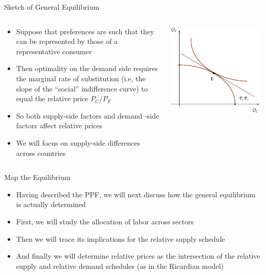 \documentclass[10pt,hyperref={CJKbookmarks=true},xcolor=dvipsnames,aspectratio=169]{beamer}
\begin{document}
\begin{frame}{Sketch of General Equilibrium}


\begin{columns}[onlytextwidth]
\begin{column}{0.5\textwidth}
\begin{itemize}
\item Suppose that preferences are such that they can be represented by
those of a representative consumer
\item Then optimality on the demand side requires the marginal rate of substitution
(i.e, the slope of the “social” indifference curve) to equal the relative
price $P_{C}/P_{F}$ 
\item So both supply-side factors and demand -side factors affect relative
prices 
\item We will focus on supply-side differences across countries 
\end{itemize}

\end{column}
\begin{column}{0.5\textwidth}
\centering \includegraphics[width=0.7\columnwidth]{fig/sfm/lec4-10}
\end{column}
\end{columns}

\end{frame}

\begin{frame}{Map the Equilibrium }

\begin{itemize}
\item Having described the PPF, we will next discuss how the general equilibrium
is actually determined 
\item First, we will study the allocation of labor across sectors 
\item Then we will trace its implications for the relative supply schedule 
\item And finally we will determine relative prices as the intersection
of the relative supply and relative demand schedules (as in the Ricardian
model) 
\end{itemize}
\end{frame}
\end{document}
